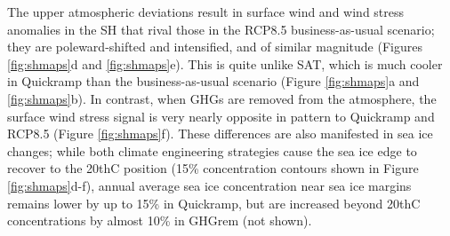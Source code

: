 \documentclass[grl]{AGUTeX}  %
\begin{document}
\begin{article}
The upper atmospheric deviations result in surface wind and wind stress anomalies in the SH that rival those in the RCP8.5 business-as-usual scenario; they are poleward-shifted and intensified, and of similar magnitude (Figures \ref{fig:shmaps}d and \ref{fig:shmaps}e). This is quite unlike SAT, which is much cooler in Quickramp than the business-as-usual scenario (Figure \ref{fig:shmaps}a and \ref{fig:shmaps}b). In contrast, when GHGs are removed from the atmosphere, the surface wind stress signal is very nearly opposite in pattern to Quickramp and RCP8.5 (Figure \ref{fig:shmaps}f). These differences are also manifested in sea ice changes; while both climate engineering strategies cause the sea ice edge to recover to the 20thC position (15\% concentration contours shown in Figure \ref{fig:shmaps}d-f), annual average sea ice concentration near sea ice margins remains lower by up to 15\% in Quickramp, but are increased beyond 20thC concentrations by almost 10\% in GHGrem (not shown). %


\end{article}
\end{document}
